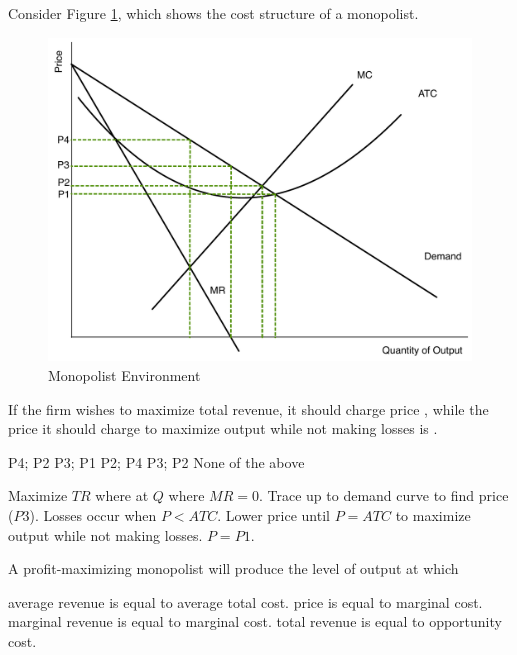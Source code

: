 \documentclass[addpoints,11pt]{exam}
\theoremstyle{definition}
\begin{document}
\begin{questions}
\question Consider Figure \ref{MC35}, which shows the cost structure of a monopolist.


\begin{figure}[H]
	\centering
	\includegraphics[scale=.40]{Final_MC35.pdf}
	\caption{Monopolist Environment}
	\label{MC35}
\end{figure}

If the firm wishes to maximize total revenue, it should charge price \underline{\hspace{3cm}}, while the price it should charge to maximize output while not making losses is \underline{\hspace{3cm}}.

\begin{choices}
	\choice P4; P2
	\CorrectChoice P3; P1
	\choice P2; P4
	\choice P3; P2
	\choice None of the above
\end{choices}

\begin{solution}
	Maximize $TR$ where at $Q$ where $MR = 0$. Trace up to demand curve to find price ($P3$). Losses occur when $P<ATC$. Lower price until $P=ATC$ to maximize output while not making losses. $P = P1$.
\end{solution}

\newpage

	\question A profit-maximizing monopolist will produce the level of output at which
	
	\begin{choices}
		\choice average revenue is equal to average total cost.
		\choice price is equal to marginal cost.
		\CorrectChoice marginal revenue is equal to marginal cost.
		\choice total revenue is equal to opportunity cost.
	\end{choices}
	

\end{questions}
\end{document}
